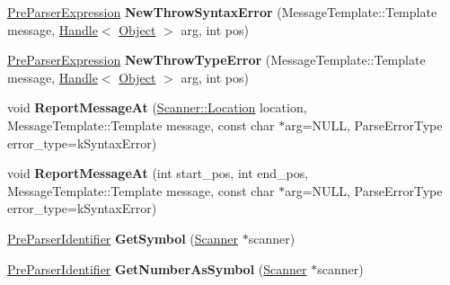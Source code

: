 \begin{DoxyCompactItemize}
\item 
\hyperlink{classv8_1_1internal_1_1_pre_parser_expression}{Pre\+Parser\+Expression} {\bfseries New\+Throw\+Syntax\+Error} (Message\+Template\+::\+Template message, \hyperlink{classv8_1_1internal_1_1_handle}{Handle}$<$ \hyperlink{classv8_1_1internal_1_1_object}{Object} $>$ arg, int pos)\hypertarget{classv8_1_1internal_1_1_pre_parser_traits_a1b575062fcfef95c1ec6d2dcfac09e53}{}\label{classv8_1_1internal_1_1_pre_parser_traits_a1b575062fcfef95c1ec6d2dcfac09e53}

\item 
\hyperlink{classv8_1_1internal_1_1_pre_parser_expression}{Pre\+Parser\+Expression} {\bfseries New\+Throw\+Type\+Error} (Message\+Template\+::\+Template message, \hyperlink{classv8_1_1internal_1_1_handle}{Handle}$<$ \hyperlink{classv8_1_1internal_1_1_object}{Object} $>$ arg, int pos)\hypertarget{classv8_1_1internal_1_1_pre_parser_traits_af264978b5d3e21d8e8ed80ed96a30471}{}\label{classv8_1_1internal_1_1_pre_parser_traits_af264978b5d3e21d8e8ed80ed96a30471}

\item 
void {\bfseries Report\+Message\+At} (\hyperlink{structv8_1_1internal_1_1_scanner_1_1_location}{Scanner\+::\+Location} location, Message\+Template\+::\+Template message, const char $\ast$arg=N\+U\+LL, Parse\+Error\+Type error\+\_\+type=k\+Syntax\+Error)\hypertarget{classv8_1_1internal_1_1_pre_parser_traits_a47659c35b693014bdaf6b3f681cdd35e}{}\label{classv8_1_1internal_1_1_pre_parser_traits_a47659c35b693014bdaf6b3f681cdd35e}

\item 
void {\bfseries Report\+Message\+At} (int start\+\_\+pos, int end\+\_\+pos, Message\+Template\+::\+Template message, const char $\ast$arg=N\+U\+LL, Parse\+Error\+Type error\+\_\+type=k\+Syntax\+Error)\hypertarget{classv8_1_1internal_1_1_pre_parser_traits_acdc29e9406c9ad28c673af31b43242c4}{}\label{classv8_1_1internal_1_1_pre_parser_traits_acdc29e9406c9ad28c673af31b43242c4}

\item 
\hyperlink{classv8_1_1internal_1_1_pre_parser_identifier}{Pre\+Parser\+Identifier} {\bfseries Get\+Symbol} (\hyperlink{classv8_1_1internal_1_1_scanner}{Scanner} $\ast$scanner)\hypertarget{classv8_1_1internal_1_1_pre_parser_traits_a8cfb581297a9136904db31925e361f3a}{}\label{classv8_1_1internal_1_1_pre_parser_traits_a8cfb581297a9136904db31925e361f3a}

\item 
\hyperlink{classv8_1_1internal_1_1_pre_parser_identifier}{Pre\+Parser\+Identifier} {\bfseries Get\+Number\+As\+Symbol} (\hyperlink{classv8_1_1internal_1_1_scanner}{Scanner} $\ast$scanner)\hypertarget{classv8_1_1internal_1_1_pre_parser_traits_a00f61186b309cb233a964794ab3c9053}{}\label{classv8_1_1internal_1_1_pre_parser_traits_a00f61186b309cb233a964794ab3c9053}


\end{DoxyCompactItemize}
